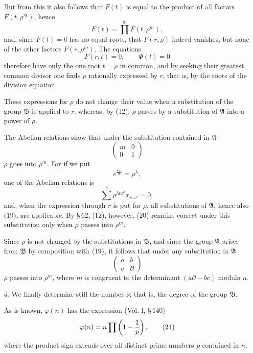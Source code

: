 \documentclass[11pt]{article}
\providecommand{\ii}{\mathrm{i}}
\begin{document}
But from this it also follows that $F(t)$ is equal to the product of all factors
$F(t,\rho^m)$, hence
\begin{equation}
 F(t)=\prod^m F(t,\rho^m),
\tag{17}
\end{equation}
and, since $F(t)=0$ has no equal roots, that $F(r,\rho)$ indeed vanishes, but none of the
other factors $F(r,\rho^m)$. The equations
\begin{equation}
 F(r,t)=0,
 \qquad \Phi(t)=0
\tag{18}
\end{equation}
therefore have only the one root $t=\rho$ in common, and by seeking their greatest common
divisor one finds $\rho$ rationally expressed by $r$, that is, by the roots of the division
equation.

These expressions for $\rho$ do not change their value when a substitution of the group
$\mathfrak B$ is applied to $r$, whereas, by (12), $\rho$ passes by a substitution of
$\mathfrak A$ into a power of $\rho$.

The Abelian relations show that under the substitution contained in $\mathfrak A$
\begin{equation}
 \begin{pmatrix}m&0\\0&1\end{pmatrix}
\tag{19}
\end{equation}
$\rho$ goes into $\rho^m$. For if we put
\[
 e^{\frac{8\pi \ii}{n}}=\rho^\lambda,
\]
one of the Abelian relations is
\begin{equation}
 \sum^\nu \rho^{\lambda\nu\nu'}x_{\nu,\nu'}=0,
\tag{20}
\end{equation}
and, when the expression through $r$ is put for $\rho$, all substitutions of $\mathfrak A$,
hence also (19), are applicable. By \S\,62, (12), however, (20) remains correct under this
substitution only when $\rho$ passes into $\rho^m$.

Since $\rho$ is not changed by the substitutions in $\mathfrak B$, and since the group
$\mathfrak A$ arises from $\mathfrak B$ by composition with (19), it follows that under any
substitution in $\mathfrak A$
\[
 \begin{pmatrix}a&b\\c&\partial\end{pmatrix}
\]
$\rho$ passes into $\rho^m$, where $m$ is congruent to the determinant
$(a\partial-bc)$ modulo $n$.

4. We finally determine still the number $\nu$, that is, the degree of the group
$\mathfrak B$.

As is known, $\varphi(n)$ has the expression (Vol. I, \S\,140)
\begin{equation}
 \varphi(n)=n\prod\left(1-{1\over p}\right),
\tag{21}
\end{equation}
where the product sign extends over all distinct prime numbers $p$ contained in $n$.
\end{document}
